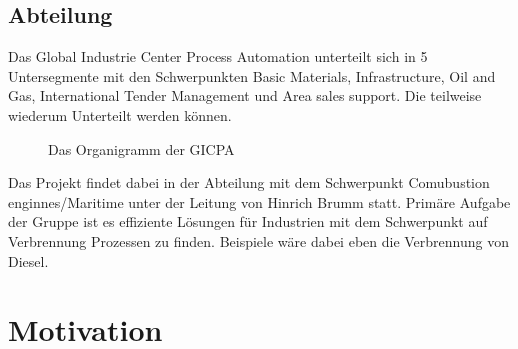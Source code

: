 \subsection{Abteilung}
Das Global Industrie Center Process Automation unterteilt sich in 5 Untersegmente mit den Schwerpunkten Basic Materials, Infrastructure, Oil and Gas, International Tender Management und Area sales support. Die teilweise wiederum Unterteilt werden können. 
\begin{figure}[H]
\centering
{}
\caption{\label{fig-firmenOG}Das Organigramm der GICPA}
\end{figure}
Das Projekt findet dabei in der Abteilung mit dem Schwerpunkt Comubustion enginnes/Maritime unter der Leitung von Hinrich Brumm statt. Primäre Aufgabe der Gruppe ist es effiziente Lösungen für Industrien mit dem Schwerpunkt auf Verbrennung Prozessen zu finden. Beispiele wäre dabei eben die Verbrennung von Diesel. 

\section{Motivation}



